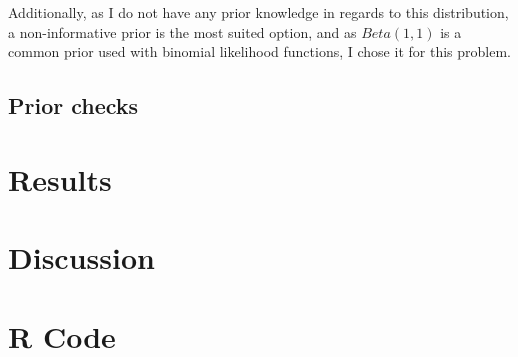 \documentclass[12pt,a4paper,twoside]{article}
\begin{document}
Additionally, as I do not have any prior knowledge in regards to this distribution, a non-informative prior
is the most suited option, and as $Beta(1,1)$ is a common prior used with binomial likelihood functions, I
chose it for this problem.

\subsection{Prior checks}
\label{ssec:priorchecks}

\section{Results}

\section{Discussion}

\appendix
\section{R Code}

\end{document}
